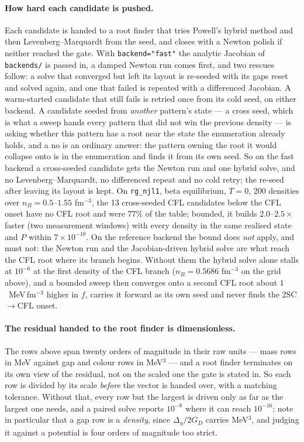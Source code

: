 \documentclass[aps,prc,onecolumn,superscriptaddress,nofootinbib,10pt]{revtex4-2}
\newcommand{\nB}{n_B}
\newcommand{\GD}{G_D}
\begin{document}
\paragraph{How hard each candidate is pushed.} Each candidate is handed to a
root finder that tries Powell's hybrid method and then Levenberg--Marquardt from
the seed, and closes with a Newton polish if neither reached the gate. With
\texttt{backend="fast"} the analytic Jacobian of \texttt{backends/} is passed
in, a damped Newton run comes first, and two rescues follow: a solve that
converged but left its layout is re-seeded with its gaps reset and solved
again, and one that failed is repeated with a differenced Jacobian. A
warm-started candidate that still fails is retried once from its cold seed, on
either backend. A candidate seeded from \emph{another} pattern's state --- a
cross seed, which is what a sweep hands every pattern that did not win the
previous density --- is asking whether this pattern has a root near the state
the enumeration already holds, and a no is an ordinary answer: the pattern
owning the root it would collapse onto is in the enumeration and finds it from
its own seed. So on the fast backend a cross-seeded candidate gets the Newton
run and one hybrid solve, and no Levenberg--Marquardt, no differenced repeat
and no cold retry; the re-seed after leaving its layout is kept. On
\texttt{rg\_njl1}, beta equilibrium, $T = 0$, 200 densities over
$\nB = 0.5$--$1.55$ fm$^{-3}$, the 13 cross-seeded CFL candidates below the
CFL onset have no CFL root and were $77\%$ of the table; bounded, it builds
$2.0$--$2.5\times$ faster (two measurement windows) with every density in the
same realised state and $P$ within $7\times10^{-10}$. On the reference backend
the bound does \emph{not} apply, and must not: the Newton run and the
Jacobian-driven hybrid solve are what reach the CFL root where its branch
begins. Without them the hybrid solve alone stalls at $10^{-6}$ at the first
density of the CFL branch ($\nB = 0.5686$ fm$^{-3}$ on the grid above), and a bounded sweep
then converges onto a second CFL root about $1$~MeV\,fm$^{-3}$ higher in $f$,
carries it forward as its own seed and never finds the 2SC$\to$CFL onset.

\paragraph{The residual handed to the root finder is dimensionless.} The rows
above span twenty orders of magnitude in their raw units --- mass rows in MeV
against gap and colour rows in MeV$^3$ --- and a root finder terminates on its
own view of the residual, not on the scaled one the gate is stated in. So each
row is divided by its scale \emph{before} the vector is handed over, with a
matching tolerance. Without that, every row but the largest is driven only as
far as the largest one needs, and a paired solve reports $10^{-8}$ where it can
reach $10^{-16}$; note in particular that a gap row is a \emph{density}, since
$\Delta_\eta/2\GD$ carries MeV$^3$, and judging it against a potential is four
orders of magnitude too strict.
\end{document}
